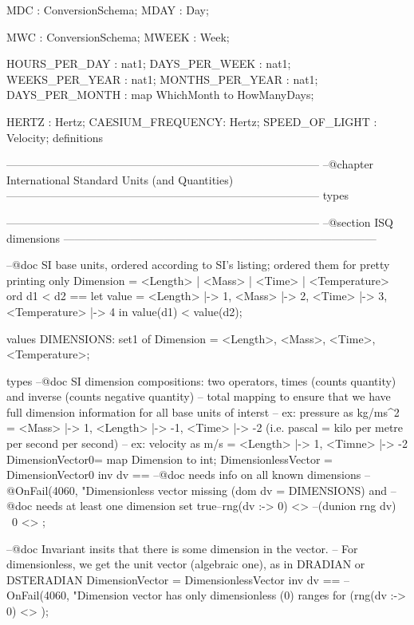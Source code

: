 \documentclass[a4paper]{article}
\begin{document}
\begin{vdm_al}
  
  MDC     : ConversionSchema;
  MDAY     : Day;
                      
  MWC        : ConversionSchema;
  MWEEK       : Week;
 
  HOURS_PER_DAY    : nat1;
  DAYS_PER_WEEK    : nat1;
  WEEKS_PER_YEAR   : nat1;
  MONTHS_PER_YEAR  : nat1;
  DAYS_PER_MONTH   : map WhichMonth to HowManyDays;
 
    HERTZ    : Hertz;
  CAESIUM_FREQUENCY: Hertz;
  SPEED_OF_LIGHT   : Velocity;
definitions

------------------------------------------------------------------------------------
--@chapter International Standard Units (and Quantities) 
------------------------------------------------------------------------------------
types

------------------------------------------------------------------------------------
--@section ISQ dimensions
------------------------------------------------------------------------------------

 --@doc SI base units, ordered according to SI's listing; ordered them for pretty printing only
 Dimension = <Length> | <Mass> | <Time> | <Temperature>
 ord d1 < d2 == 
  let 
   value = { <Length> |-> 1, <Mass> |-> 2, <Time> |-> 3,  <Temperature> |-> 4
         }
    in value(d1) < value(d2);
    
values
 DIMENSIONS: set1 of Dimension = {<Length>, <Mass>, <Time>, <Temperature>};

types
  --@doc SI dimension compositions: two operators, times (counts quantity) and inverse (counts negative quantity)
 --   total mapping to ensure that we have full dimension information for all base units of interst 
 --   ex: pressure as kg/ms^2 = { <Mass> |-> 1, <Length> |-> -1, <Time> |-> -2 } (i.e. pascal = kilo per metre per second per second)  
 --   ex: velocity as m/s = { <Length> |-> 1, <Timne> |-> -2 }
 DimensionVector0= map Dimension to int;
 DimensionlessVector = DimensionVector0
 inv dv == 
  --@doc needs info on all known dimensions
  --@OnFail(4060, "Dimensionless vector missing %
  (dom dv = DIMENSIONS)
  and
  --@doc needs at least one dimension set 
  true--rng(dv :-> {0}) <> {} 
  --(dunion rng dv) \ {0} <> {}
  ;

 --@doc Invariant insits that there is some dimension in the vector. 
 --     For dimensionless, we get the unit vector (algebraic one), as in DRADIAN or DSTERADIAN
 DimensionVector = DimensionlessVector
 inv dv == 
  --OnFail(4060, "Dimension vector has only dimensionless (0) ranges for %
  (rng(dv :-> {0}) <> {});
        

\end{vdm_al}
\end{document}
